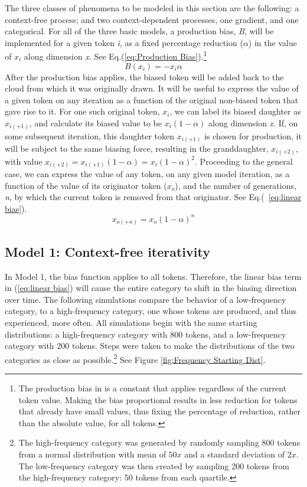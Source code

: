 The three classes of phenomena to be modeled in this section are the
following: a context-free process; and two context-dependent processes, 
one gradient, and one categorical. For all of the three basic models,
a production bias, \emph{B}, will be implemented for a given token
\emph{i}, as a fixed percentage reduction ($\alpha$) in the value
of \emph{$x_{i}$} along dimension \emph{x}. See Eq.(\ref{eq:Production Bias}).\footnote{The production bias in \citet{Pierrehumbert2000} is a constant that
applies regardless of the current token value. Making the bias proportional
results in less reduction for tokens that already have small values, thus
fixing the percentage of reduction, rather than the absolute value,
for all tokens.} 
\begin{equation}
B(x_{i})=-x_{i}\alpha\label{eq:Production Bias}
\end{equation}
After the production bias applies, the biased token will be added
back to the cloud from which it was originally drawn. It will be useful
to express the value of a given token on any iteration as a function
of the original non-biased token that gave rise to it. For one such
original token, $x_{i}$, we can label its biased daughter as $x_{i(+1)}$,
and calculate its biased value to be $x_{i}\left(1-\alpha\right)$
along dimension \emph{x}. If, on some subsequent iteration, this daughter
token $x_{i(+1)}$ is chosen for production, it will be subject to
the same biasing force, resulting in the granddaughter, $x_{i(+2)}$,
with value $x_{i(+2)}=x_{i(+1)}\left(1-\alpha\right)=x_{i}\left(1-\alpha\right)^{2}$.
Proceeding to the general case, we can express the value of any token,
on any given model iteration, as a function of the value of its originator
token ($x_{o}$), and the number of generations, \emph{n}, by which
the current token is removed from that originator. See Eq.(~\ref{eq:linear bias}). 
\begin{equation}
x_{o(+n)}=x_{o}\left(1-\alpha\right)^{n}\label{eq:linear bias}
\end{equation}


\subsection{\label{subsec:Model-1:-Context-Free}Model 1: Context-free iterativity}

In Model 1, the bias function applies to all tokens. Therefore, the
linear bias term in (\ref{eq:linear bias}) will cause the entire
category to shift in the biasing direction over time. The following
simulations compare the behavior of a low-frequency category, to a
high-frequency category, one whose tokens are produced, and thus experienced,
more often. All simulations begin with the same starting distributions:
a high-frequency category with 800 tokens, and a low-frequency category
with 200 tokens. Steps were taken to make the distributions of the
two categories as close as possible.\footnote{The high-frequency category was generated by randomly sampling 800
tokens from a normal distribution with mean of $50x$ and a standard
deviation of $2x$. The low-frequency category was then created by
sampling 200 tokens from the high-frequency category: 50 tokens from
each quartile.} See Figure \ref{fig:Frequency Starting Dist}. 

